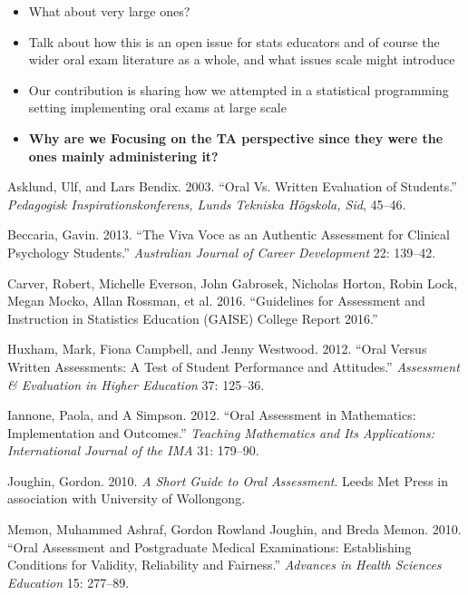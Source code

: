 \documentclass[
  letterpaper,
  DIV=11,
  numbers=noendperiod]{scrartcl}
\newlength{\cslhangindent}
\newlength{\cslentryspacingunit} %
\newenvironment{CSLReferences}[2] %
 {%
  \setlength{\parindent}{0pt}
  \ifodd #1
  \let\oldpar\par
  \def\par{\hangindent=\cslhangindent\oldpar}
  \fi
  \setlength{\parskip}{#2\cslentryspacingunit}
 }%
 {}
\begin{document}
\begin{itemize}
\item
  What about very large ones?
\item
  Talk about how this is an open issue for stats educators and of course
  the wider oral exam literature as a whole, and what issues scale might
  introduce
\item
  Our contribution is sharing how we attempted in a statistical
  programming setting implementing oral exams at large scale
\item
  \textbf{Why are we Focusing on the TA perspective since they were the
  ones mainly administering it?}
\end{itemize}

\hypertarget{refs}{}
\begin{CSLReferences}{1}{0}
\leavevmode{}%
Asklund, Ulf, and Lars Bendix. 2003. {``Oral Vs. Written Evaluation of
Students.''} \emph{Pedagogisk Inspirationskonferens, Lunds Tekniska
Högskola, Sid}, 45--46.

\leavevmode{}%
Beccaria, Gavin. 2013. {``The Viva Voce as an Authentic Assessment for
Clinical Psychology Students.''} \emph{Australian Journal of Career
Development} 22: 139--42.

\leavevmode{}%
Carver, Robert, Michelle Everson, John Gabrosek, Nicholas Horton, Robin
Lock, Megan Mocko, Allan Rossman, et al. 2016. {``Guidelines for
Assessment and Instruction in Statistics Education (GAISE) College
Report 2016.''}

\leavevmode{}%
Huxham, Mark, Fiona Campbell, and Jenny Westwood. 2012. {``Oral Versus
Written Assessments: A Test of Student Performance and Attitudes.''}
\emph{Assessment \& Evaluation in Higher Education} 37: 125--36.

\leavevmode{}%
Iannone, Paola, and A Simpson. 2012. {``Oral Assessment in Mathematics:
Implementation and Outcomes.''} \emph{Teaching Mathematics and Its
Applications: International Journal of the IMA} 31: 179--90.

\leavevmode{}%
Joughin, Gordon. 2010. \emph{A Short Guide to Oral Assessment}. Leeds
Met Press in association with University of Wollongong.

\leavevmode{}%
Memon, Muhammed Ashraf, Gordon Rowland Joughin, and Breda Memon. 2010.
{``Oral Assessment and Postgraduate Medical Examinations: Establishing
Conditions for Validity, Reliability and Fairness.''} \emph{Advances in
Health Sciences Education} 15: 277--89.


\end{CSLReferences}
\end{document}
